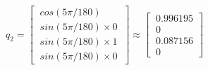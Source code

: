 \documentclass[preview]{standalone}
\begin{document}
\begin{center}
$q_2 = \begin{bmatrix}\
                    cos(5\pi/180) \\\
                    sin(5\pi/180) \times 0 \\\
                    sin(5\pi/180) \times 1 \\\
                    sin(5\pi/180) \times 0\
                \end{bmatrix} \approx \begin{bmatrix}\
                    0.996195 \\\
                    0 \\\
                    0.087156 \\\
                    0\
                \end{bmatrix}$
\end{center}
\end{document}
